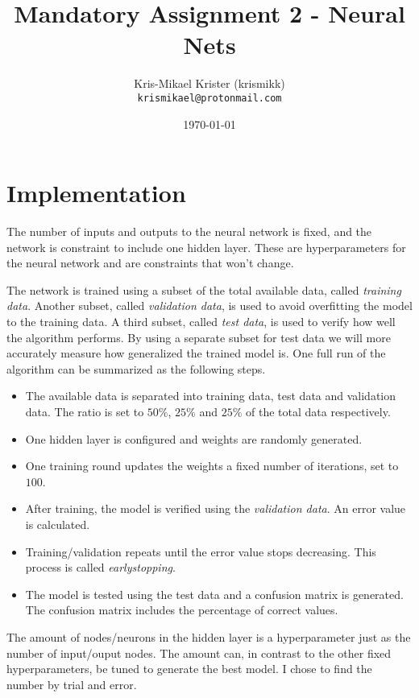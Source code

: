 \documentclass{article}
\title{Mandatory Assignment 2 - Neural Nets}
\author{Kris-Mikael Krister (krismikk)\\\texttt{krismikael@protonmail.com}}
\date{\today}
\begin{document}
\maketitle

\section*{Implementation}

The number of inputs and outputs to the neural network is fixed, and the network is constraint to include one hidden layer. These are hyperparameters for the neural network and are constraints that won't change.

The network is trained using a subset of the total available data, called \emph{training data}. Another subset, called \emph{validation data}, is used to avoid overfitting the model to the training data. A third subset, called \emph{test data}, is used to verify how well the algorithm performs. By using a separate subset for test data we will more accurately measure how generalized the trained model is. One full run of the algorithm can be summarized as the following steps.

\begin{itemize}
    \item The available data is separated into training data, test data and validation data. The ratio is set to $50\%$, $25\%$ and $25\%$ of the total data respectively.
    \item One hidden layer is configured and weights are randomly generated.
    \item One training round updates the weights a fixed number of iterations, set to $100$.
    \item After training, the model is verified using the \emph{validation data}. An error value is calculated.
    \item Training/validation repeats until the error value stops decreasing. This process is called \emph{earlystopping}.
    \item The model is tested using the test data and a confusion matrix is generated. The confusion matrix includes the percentage of correct values.
\end{itemize}

\noindent The amount of nodes/neurons in the hidden layer is a hyperparameter just as the number of input/ouput nodes. The amount can, in contrast to the other fixed hyperparameters, be tuned to generate the best model. I chose to find the number by trial and error.
\end{document}
